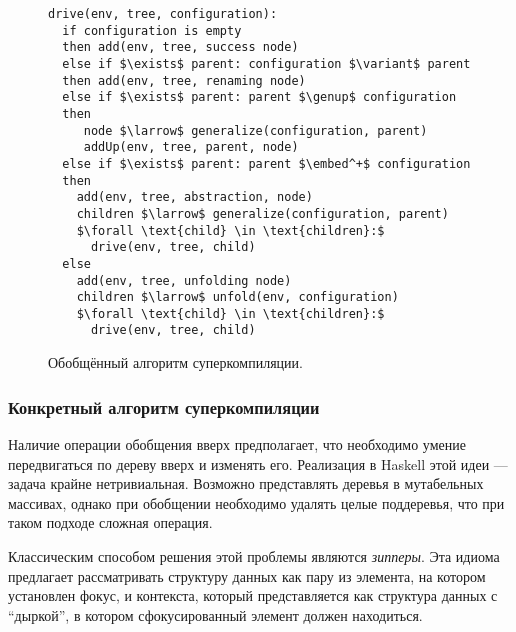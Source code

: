 \begin{figure}[h!]
\begin{lstlisting}
drive(env, tree, configuration):
  if configuration is empty
  then add(env, tree, success node)
  else if $\exists$ parent: configuration $\variant$ parent
  then add(env, tree, renaming node)
  else if $\exists$ parent: parent $\genup$ configuration
  then
     node $\larrow$ generalize(configuration, parent)
     addUp(env, tree, parent, node)
  else if $\exists$ parent: parent $\embed^+$ configuration
  then
    add(env, tree, abstraction, node)
    children $\larrow$ generalize(configuration, parent)
    $\forall \text{child} \in \text{children}:$
      drive(env, tree, child)
  else
    add(env, tree, unfolding node)
    children $\larrow$ unfold(env, configuration)
    $\forall \text{child} \in \text{children}:$
      drive(env, tree, child)
\end{lstlisting}
\caption{Обобщённый алгоритм суперкомпиляции.}
\label{fig:scalgogen}
\end{figure}





\subsubsection{Конкретный алгоритм суперкомпиляции}

Наличие операции обобщения вверх предполагает, что необходимо умение передвигаться по дереву вверх и изменять его. 
Реализация в Haskell этой идеи --- задача крайне нетривиальная. Возможно представлять
деревья в мутабельных массивах, однако при обобщении необходимо удалять целые поддеревья,
что при таком подходе сложная операция.

Классическим способом решения этой проблемы являются \emph{зипперы}\cite{zipper}.
Эта идиома предлагает рассматривать структуру данных как пару из элемента,
на котором установлен фокус, и контекста, который представляется как структура данных
с ``дыркой'', в котором сфокусированный элемент должен находиться.

